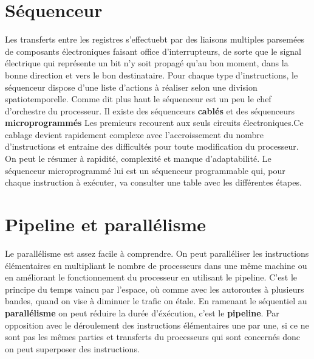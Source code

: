\documentclass{report}
\begin{document}
\section{Séquenceur}
Les transferts entre les registres s'effectuebt par des liaisons multiples parsemées de composants électroniques faisant office d'interrupteurs, de sorte que le signal électrique qui représente un bit n'y soit propagé qu'au bon moment, dans la bonne direction et vers le bon destinataire. Pour chaque type d'instructions, le séquenceur dispose d'une liste d'actions à réaliser selon une division spatiotemporelle. Comme dit plus haut le séquenceur est un peu le chef d'orchestre du processeur. Il existe des séquenceurs {\bf cablés} et des séquenceurs {\bf microprogrammés} Les premieurs recourent aux seuls circuits électroniques.Ce cablage devient rapidement complexe avec l'accroissement du nombre d'instructions et entraine des difficultés pour toute modification du processeur. On peut le résumer à rapidité, complexité et manque d'adaptabilité. Le séquenceur microprogrammé lui est un séquenceur programmable qui, pour chaque instruction à exécuter, va consulter une table avec les différentes étapes.

\section{Pipeline et parallélisme}
Le parallélisme est assez facile à comprendre.
On peut paralléliser les instructions élémentaires en multipliant le nombre de processeurs dans une même machine ou en améliorant le fonctionnement du processeur en utilisant le pipeline.
C'est le principe du temps vaincu par l'espace, où comme avec les autoroutes à plusieurs bandes, quand on vise à diminuer le trafic on étale.
En ramenant le séquentiel au {\bf parallélisme} on peut réduire la durée d'éxécution, c'est le {\bf pipeline}. Par opposition avec le déroulement des instructions élémentaires une par une, si ce ne sont pas les mêmes parties et transferts du processeurs qui sont concernés donc on peut superposer des instructions.\\


\begin{center}
\end{center}
\end{document}
